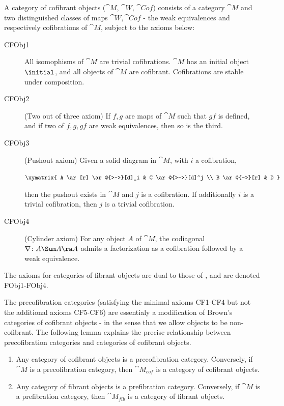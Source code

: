 \begin{defn}
\label{defn:catcofobj}
A category of cofibrant objects $({\cat M}$, ${\cat W}$, ${\cat Cof})$ consists of a category ${\cat M}$ and two distinguished classes of maps ${\cat W}, {\cat Cof}$ - the weak equivalences and respectively cofibrations of ${\cat M}$, subject to the axioms below:
\begin{description}
\item[CFObj1] 
All isomophisms of ${\cat M}$ are trivial cofibrations. ${\cat M}$ has an initial object $\initial$, and all objects of ${\cat M}$ are cofibrant. Cofibrations are stable under composition. 
\item[CFObj2] 
(Two out of three axiom) If $f, g$ are maps of ${\cat M}$ such that $gf$ is defined, and if two of $f, g, gf$ are weak equivalences, then so is the third.
\item[CFObj3] 
(Pushout axiom) Given a solid diagram in ${\cat M}$, with $i$ a cofibration,
\begin{center}
$ \xymatrix {
	A \ar[r] \ar@{>->}[d]_i &
	C \ar@{>->}[d]^j \\
	B \ar@{-->}[r] &
	D
	}$
\end{center}
then the pushout exists in ${\cat M}$ and $j$ is a cofibration. If additionally $i$ is a trivial cofibration, then $j$ is a trivial cofibration.
\item[CFObj4]
(Cylinder axiom) For any object $A$ of ${\cat M}$, the codiagonal $\nabla \colon A \Sum A \ra A$ admits a factorization as a cofibration followed by a weak equivalence.
\end{description}
\end{defn}

The axioms for categories of fibrant objects are dual to those of , and are denoted FObj1-FObj4.

The precofibration categories (satisfying the minimal axioms CF1-CF4 but not the additional axioms CF5-CF6) are essentialy a modification of Brown's categories of cofibrant objects - in the sense that we allow objects to be non-cofibrant. The following lemma explains the precise relationship between precofibration categories and categories of cofibrant objects.

\begin{prop}
\label{prop:relcatcofobj}
\mbox{}
\begin{enumerate}
\item
Any category of cofibrant objects is a precofibration category. Conversely, if ${\cat M}$ is a precofibration category, then ${\cat M}_{cof}$ is a category of cofibrant objects. 
\item
Any category of fibrant objects is a prefibration category. Conversely, if ${\cat M}$ is a prefibration category, then ${\cat M}_{fib}$ is a category of fibrant objects. 
\end{enumerate}
\end{prop}

